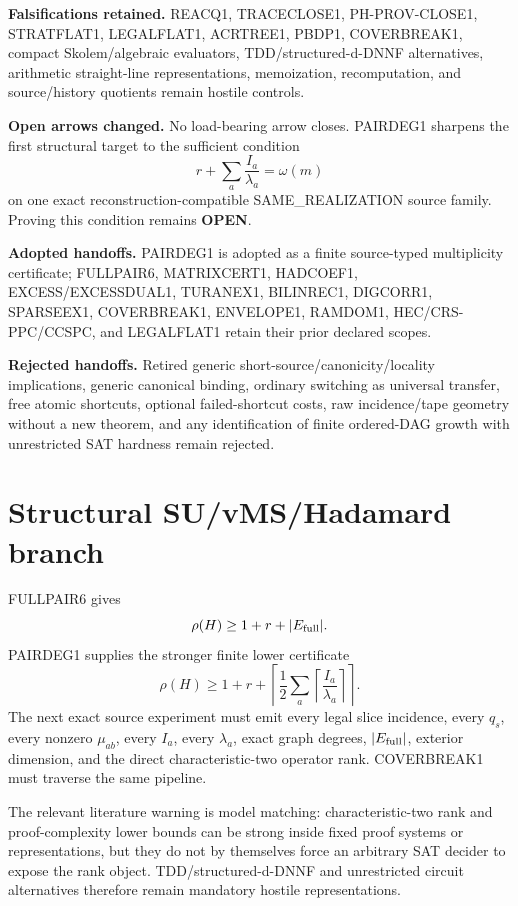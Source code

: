 \documentclass[11pt]{article}
\begin{document}
\textbf{Falsifications retained.}
REACQ1, TRACECLOSE1, PH-PROV-CLOSE1, STRATFLAT1, LEGALFLAT1, ACRTREE1, PBDP1, COVERBREAK1, compact Skolem/algebraic evaluators, TDD/structured-d-DNNF alternatives, arithmetic straight-line representations, memoization, recomputation, and source/history quotients remain hostile controls.

\textbf{Open arrows changed.}
No load-bearing arrow closes. PAIRDEG1 sharpens the first structural target to the sufficient condition
\[
\boxed{
r+\sum_a\frac{I_a}{\lambda_a}=\omega(m)
}
\]
on one exact reconstruction-compatible SAME\_REALIZATION source family. Proving this condition remains \textbf{OPEN}.

\textbf{Adopted handoffs.}
PAIRDEG1 is adopted as a finite source-typed multiplicity certificate; FULLPAIR6, MATRIXCERT1, HADCOEF1, EXCESS/EXCESSDUAL1, TURANEX1, BILINREC1, DIGCORR1, SPARSEEX1, COVERBREAK1, ENVELOPE1, RAMDOM1, HEC/CRS-PPC/CCSPC, and LEGALFLAT1 retain their prior declared scopes.

\textbf{Rejected handoffs.}
Retired generic short-source/canonicity/locality implications, generic canonical binding, ordinary switching as universal transfer, free atomic shortcuts, optional failed-shortcut costs, raw incidence/tape geometry without a new theorem, and any identification of finite ordered-DAG growth with unrestricted SAT hardness remain rejected.

\section*{Structural SU/vMS/Hadamard branch}
FULLPAIR6 gives
\[
\rho(H)\ge 1+r+|E_{\rm full}|.
\]
PAIRDEG1 supplies the stronger finite lower certificate
\[
\rho(H)\ge
1+r+
\left\lceil\frac12\sum_a
\left\lceil\frac{I_a}{\lambda_a}\right\rceil\right\rceil.
\]
The next exact source experiment must emit every legal slice incidence, every \(q_s\), every nonzero \(\mu_{ab}\), every \(I_a\), every \(\lambda_a\), exact graph degrees, \(|E_{\rm full}|\), exterior dimension, and the direct characteristic-two operator rank. COVERBREAK1 must traverse the same pipeline.

The relevant literature warning is model matching: characteristic-two rank and proof-complexity lower bounds can be strong inside fixed proof systems or representations, but they do not by themselves force an arbitrary SAT decider to expose the rank object. TDD/structured-d-DNNF and unrestricted circuit alternatives therefore remain mandatory hostile representations.
\end{document}
